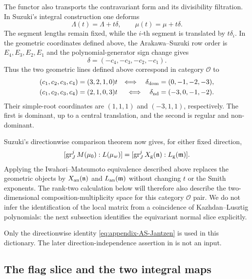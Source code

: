 \documentclass[11pt]{amsart}
\theoremstyle{definition}
\theoremstyle{remark}
\begin{document}
The functor also transports the contravariant form and its divisibility
filtration.  In Suzuki's integral construction one deforms
\[
 \Lambda(t)=\Lambda+t\delta,
 \qquad
 \mu(t)=\mu+t\delta.
\]
The segment lengths remain fixed, while the $i$-th segment is translated by
$t\delta_i$.  In the geometric coordinates defined above, the
Arakawa--Suzuki row order is $E_4,E_3,E_2,E_1$ and the polynomial-generator
sign change gives
\begin{equation}\label{eq:appendix-AS-direction-dictionary}
 \delta=(-c_4,-c_3,-c_2,-c_1).
\end{equation}
Thus the two geometric lines defined above correspond in category
$\mathcal O$ to
\begin{align*}
 (c_1,c_2,c_3,c_4)&=(3,2,1,0)t
 &\Longleftrightarrow\quad
 \delta_{\rm dom}&=(0,-1,-2,-3),\\
 (c_1,c_2,c_3,c_4)&=(2,1,0,3)t
 &\Longleftrightarrow\quad
 \delta_{\rm nd}&=(-3,0,-1,-2).
\end{align*}
Their simple-root coordinates are $(1,1,1)$ and $(-3,1,1)$,
respectively.  The first is dominant, up to a central translation, and the
second is regular and non-dominant.

Suzuki's directionwise comparison theorem
\cite[Theorem~4.3.5]{Suzuki} now gives, for either fixed direction,
\begin{equation}\label{eq:appendix-AS-Jantzen}
 [\operatorname{gr}_J^jM(\mu_0):L(\mu_w)]
 =
 [\operatorname{gr}_J^jX_{\rm g}(\mathfrak n):
    L_{\rm g}(\mathfrak m)].
\end{equation}
Applying the Iwahori--Matsumoto equivalence described above replaces the
geometric objects by $X_{\rm an}(\mathfrak n)$ and
$L_{\rm an}(\mathfrak m)$ without changing $t$ or the Smith exponents.
The rank-two calculation below will therefore also describe the
two-dimensional composition-multiplicity space for this category
$\mathcal O$ pair.  We do not infer the identification of the local
matrix from a coincidence of Kazhdan--Lusztig polynomials: the next
subsection identifies the equivariant normal slice explicitly.

Only the directionwise identity \eqref{eq:appendix-AS-Jantzen} is used
in this dictionary.  The later direction-independence assertion in
\cite[Proposition~5.3.2]{Suzuki} is not an input.

\subsection{The flag slice and the two integral maps}
\end{document}
